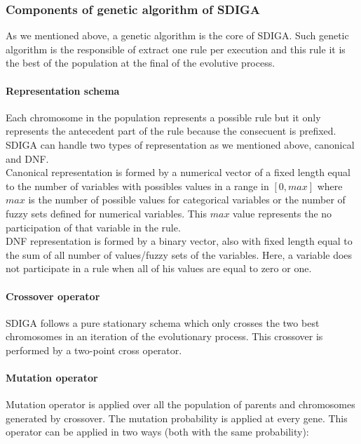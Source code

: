\documentclass[]{article}
\begin{document}
\subsubsection{Components of genetic algorithm of
SDIGA}\label{components-of-genetic-algorithm-of-sdiga}

As we mentioned above, a genetic algorithm is the core of SDIGA. Such
genetic algorithm is the responsible of extract one rule per execution
and this rule it is the best of the population at the final of the
evolutive process.

\paragraph{Representation schema
\label{esquemas}}\label{representation-schema}

Each chromosome in the population represents a possible rule but it only
represents the antecedent part of the rule because the consecuent is
prefixed. SDIGA can handle two types of representation as we mentioned
above, canonical and DNF.\\Canonical representation is formed by a
numerical vector of a fixed length equal to the number of variables with
possibles values in a range in $[0, max]$ where $max$ is the number of
possible values for categorical variables or the number of fuzzy sets
defined for numerical variables. This $max$ value represents the no
participation of that variable in the rule.\\DNF representation is
formed by a binary vector, also with fixed length equal to the sum of
all number of values/fuzzy sets of the variables. Here, a variable does
not participate in a rule when all of his values are equal to zero or
one.

\paragraph{Crossover operator \label{cruce}}\label{crossover-operator}

SDIGA follows a pure stationary schema which only crosses the two best
chromosomes in an iteration of the evolutionary process. This crossover
is performed by a two-point cross operator.

\paragraph{Mutation operator \label{mutacion}}\label{mutation-operator}

Mutation operator is applied over all the population of parents and
chromosomes generated by crossover. The mutation probability is applied
at every gene. This operator can be applied in two ways (both with the
same probability):
\end{document}
